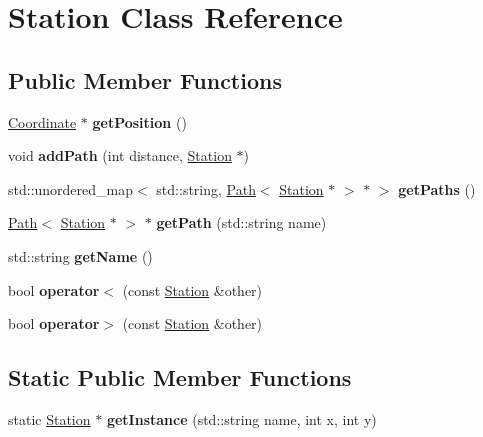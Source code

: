 \hypertarget{class_station}{}\section{Station Class Reference}
\label{class_station}
\subsection*{Public Member Functions}
\begin{DoxyCompactItemize}
\item 
\mbox{\label{class_station_ace8d8af8f5bba5a95283763d3945f827}} 
\mbox{\hyperlink{struct_coordinate}{Coordinate}} $\ast$ {\bfseries get\+Position} ()
\item 
\mbox{\label{class_station_a21a67376166fa63c399d0eb7787fb48b}} 
void {\bfseries add\+Path} (int distance, \mbox{\hyperlink{class_station}{Station}} $\ast$)
\item 
\mbox{\label{class_station_a2a9fe64924776bb4a69ed605e318edae}} 
std\+::unordered\+\_\+map$<$ std\+::string, \mbox{\hyperlink{struct_path}{Path}}$<$ \mbox{\hyperlink{class_station}{Station}} $\ast$ $>$ $\ast$ $>$ {\bfseries get\+Paths} ()
\item 
\mbox{\label{class_station_a3c00ed62bb4162110aa41e2e2317f618}} 
\mbox{\hyperlink{struct_path}{Path}}$<$ \mbox{\hyperlink{class_station}{Station}} $\ast$ $>$ $\ast$ {\bfseries get\+Path} (std\+::string name)
\item 
\mbox{\label{class_station_ae353616abbfca44e00a0baa730998d1c}} 
std\+::string {\bfseries get\+Name} ()
\item 
\mbox{\label{class_station_a9e92c0c15760682ac8ed41cb0bd4f208}} 
bool {\bfseries operator$<$} (const \mbox{\hyperlink{class_station}{Station}} \&other)
\item 
\mbox{\label{class_station_a2fc0e86c69ffe0997f96366385f4a8fb}} 
bool {\bfseries operator$>$} (const \mbox{\hyperlink{class_station}{Station}} \&other)
\end{DoxyCompactItemize}
\subsection*{Static Public Member Functions}
\begin{DoxyCompactItemize}
\item 
\mbox{\label{class_station_ad62c26d1d947a25e1081fcf5792cf16e}} 
static \mbox{\hyperlink{class_station}{Station}} $\ast$ {\bfseries get\+Instance} (std\+::string name, int x, int y)
\end{DoxyCompactItemize}
